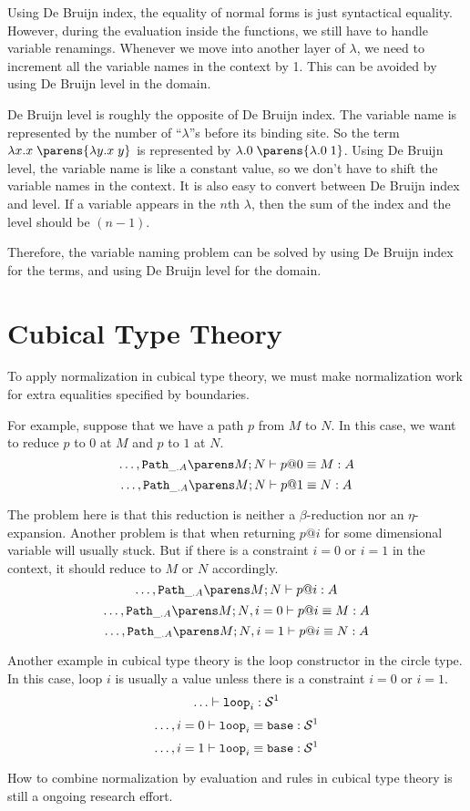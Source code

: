\documentclass[11pt]{article}
\begin{document}
Using De Bruijn index, the equality of normal forms is just syntactical equality. However, during the evaluation inside the functions, we still have to handle variable renamings. Whenever we move into another layer of $\lambda$, we need to increment all the variable names in the context by 1. This can be avoided by using De Bruijn level in the domain.

De Bruijn level is roughly the opposite of De Bruijn index. The variable name is represented by the number of ``$\lambda$''s before its binding site. So the term $\lam{x}{\app{x}{\parens{\lam{y}{\app{x}{y}}}}}$ is represented by $\lam{}{\app{0}{\parens{\lam{}{\app{0}{1}}}}}$. Using De Bruijn level, the variable name is like a constant value, so we don't have to shift the variable names in the context. It is also easy to convert between De Bruijn index and level. If a variable appears in the $n$th $\lambda$, then the sum of the index and the level should be $(n-1)$.

Therefore, the variable naming problem can be solved by using De Bruijn index for the terms, and using De Bruijn level for the domain.

\section{Cubical Type Theory}
To apply normalization in cubical type theory, we must make normalization work for extra equalities specified by boundaries.

For example, suppose that we have a path $p$ from $M$ to $N$. In this case, we want to reduce $p$ to $0$ at $M$ and $p$ to $1$ at $N$.
\[
  \eqterm{\hdots, \pathtype{\_}{A}{M}{N}}{p@0}{M}{A}
\]
\[
  \eqterm{\hdots, \pathtype{\_}{A}{M}{N}}{p@1}{N}{A}
\]

The problem here is that this reduction is neither a $\beta$-reduction nor an $\eta$-expansion. Another problem is that when returning $p@i$ for some dimensional variable will usually stuck. But if there is a constraint $i=0$ or $i=1$ in the context, it should reduce to $M$ or $N$ accordingly.
\[
\oftype{\hdots, \pathtype{\_}{A}{M}{N}}{p@i}{A}
\]
\[
\eqterm{\hdots, \pathtype{\_}{A}{M}{N}, i=0}{p@i}{M}{A}
\]
\[
\eqterm{\hdots, \pathtype{\_}{A}{M}{N}, i=1}{p@i}{N}{A}
\]

Another example in cubical type theory is the loop constructor in the circle type. In this case, loop $i$ is usually a value unless there is a constraint $i=0$ or $i=1$.
\[
\oftype{\hdots}{\sphereloop_i}{\spheretype{1}}
\]
\[
\eqterm{\hdots, i=0}{\sphereloop_i}{\spherebase}{\spheretype{1}}
\]
\[
\eqterm{\hdots, i=1}{\sphereloop_i}{\spherebase}{\spheretype{1}}
\]

How to combine normalization by evaluation and rules in cubical type theory is still a ongoing research effort.
\end{document}
